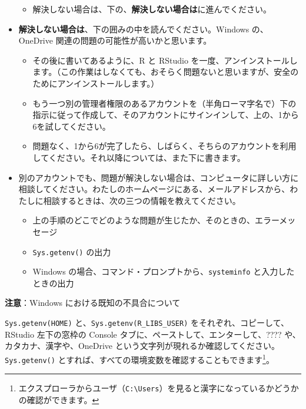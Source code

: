 \documentclass[
]{bxjsbook}
\providecommand{\tightlist}{%
  \setlength{\itemsep}{0pt}\setlength{\parskip}{0pt}}
\theoremstyle{definition}
\theoremstyle{definition}
\theoremstyle{definition}
\theoremstyle{definition}
\theoremstyle{remark}
\begin{document}
\begin{itemize}
  \begin{itemize}
  \tightlist
  \item
    解決しない場合は、下の、\textbf{解決しない場合は}に進んでください。
  \end{itemize}
\item
  \textbf{解決しない場合は}、下の囲みの中を読んでください。Windows の、OneDrive 関連の問題の可能性が高いかと思います。

  \begin{itemize}
  \tightlist
  \item
    その後に書いてあるように、R と RStudio を一度、アンインストールします。（この作業はしなくても、おそらく問題ないと思いますが、安全のためにアンインストールします。）
  \item
    もう一つ別の管理者権限のあるアカウントを（半角ローマ字名で）下の指示に従って作成して、そのアカウントにサインインして、上の、1から6を試してください。
  \item
    問題なく、1から6が完了したら、しばらく、そちらのアカウントを利用してください。それ以降については、また下に書きます。
  \end{itemize}
\item
  別のアカウントでも、問題が解決しない場合は、コンピュータに詳しい方に相談してください。わたしのホームページにある、メールアドレスから、わたしに相談するときは、次の三つの情報を教えてください。

  \begin{itemize}
  \tightlist
  \item
    上の手順のどこでどのような問題が生じたか、そのときの、エラーメッセージ
  \item
    \texttt{Sys.getenv()} の出力
  \item
    Windows の場合、コマンド・プロンプトから、\texttt{systeminfo} と入力したときの出力
  \end{itemize}
\end{itemize}

\textbf{注意}：Windows における既知の不具合について

\texttt{Sys.getenv(\textquotesingle{}HOME\textquotesingle{})} と、\texttt{Sys.getenv(\textquotesingle{}R\_LIBS\_USER\textquotesingle{})} をそれぞれ、コピーして、RStudio 左下の窓枠の Console タブに、ペーストして、エンターして、???? や、カタカナ、漢字や、OneDrive という文字列が現れるか確認してください。\texttt{Sys.getenv()} とすれば、すべての環境変数を確認することもできます\footnote{エクスプローラからユーザ（\texttt{C:\textbackslash{}Users}）を見ると漢字になっているかどうかの確認ができます。}。
\end{document}
